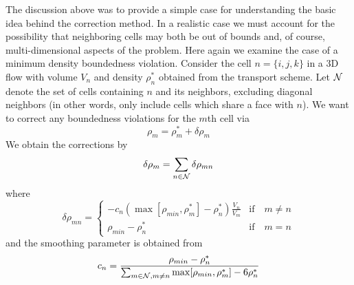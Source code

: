 \documentclass[11pt]{book}
\begin{document}
The discussion above was to provide a simple case for understanding the basic idea behind the correction method.  In a realistic case we must account for the possibility that neighboring cells may both be out of bounds and, of course, multi-dimensional aspects of the problem.  Here again we examine the case of a minimum density boundedness violation. Consider the cell $n = \{i,j,k\}$ in a 3D flow with volume $V_n$ and density $\rho_n^*$ obtained from the transport scheme.  Let $\cal N$ denote the set of cells containing $n$ and its neighbors, excluding diagonal neighbors (in other words, only include cells which share a face with $n$).  We want to correct any boundedness violations for the $m$th cell via
\begin{equation}
\label{eqn_rhocor2}
\rho_m = \rho_m^* + \delta \rho_m
\end{equation}
We obtain the corrections by
\begin{equation}
\label{eqn_sumdrho}
\delta \rho_m = \sum_{n\in {\cal N}} \delta \rho_{mn}
\end{equation}
where
\begin{equation}
\delta \rho_{mn} = \left\{ \begin{array}{ll}  \displaystyle -c_n( \max[\rho_{min},\rho_m^*] - \rho_n^*)\frac{V_n}{V_m} & \mbox{if} \quad m\ne n \\ \displaystyle \rho_{min} - \rho_n^* & \mbox{if} \quad m=n \end{array} \right.
\end{equation}
and the smoothing parameter is obtained from
\begin{equation}
\label{eqn_realc}
c_n = \frac{\rho_{min} - \rho_n^*}{ \sum_{m\in {\cal N},m\ne n} \max[\rho_{min},\rho_m^*] - 6 \rho_n^*}
\end{equation}
\end{document}
